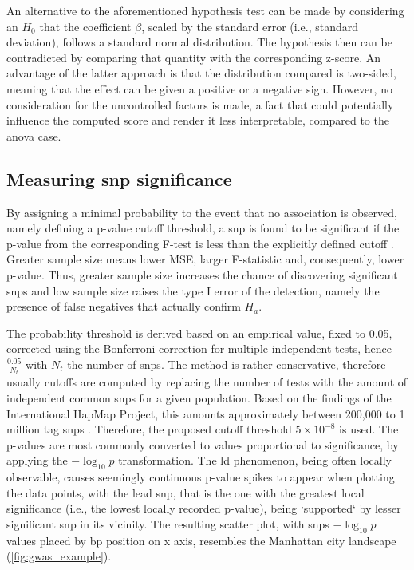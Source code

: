 An alternative to the aforementioned hypothesis test can be made by considering an $H_0$ that the coefficient $\beta$,  scaled by the standard error (i.e., standard deviation), follows a standard normal distribution. The hypothesis then can be contradicted by comparing that quantity with the corresponding z-score. An advantage of the latter approach is that the distribution compared is two-sided, meaning that the effect can be given a positive or a negative sign. However, no consideration for the uncontrolled factors is made, a fact that could potentially influence the computed score and render it less interpretable, compared to the \ac{anova} case.

\subsection{Measuring \ac{snp} significance}

By assigning a minimal probability to the event that no association is observed, namely defining a p-value cutoff threshold, a \ac{snp} is found to be significant if the p-value from the corresponding F-test is less than the explicitly defined cutoff \cite{AlejandroGonzalez-Chica2015}. Greater sample size means lower MSE, larger F-statistic and, consequently, lower p-value. Thus, greater sample size increases the chance of discovering significant \acp{snp} and low sample size raises the type I error of the detection, namely the presence of false negatives that actually confirm $H_a$.

The probability threshold is derived based on an empirical value, fixed to 0.05, corrected using the Bonferroni correction for multiple independent tests, hence $\frac{0.05}{N_t}$ with $N_t$ the number of \acp{snp}. The method is rather conservative, therefore usually cutoffs are computed by replacing the number of tests with the amount of independent common \acp{snp} for a given population. Based on the findings of the International HapMap Project, this amounts approximately between 200,000 to 1 million tag \acp{snp} \cite{Belmont2003}. Therefore, the proposed cutoff threshold $5\times 10 ^ {-8}$ is used. The p-values are most commonly converted to values proportional to significance, by applying the $-\log_{10}{p}$ transformation.   The \ac{ld} phenomenon, being often locally observable, causes seemingly continuous p-value spikes to appear when plotting the data points, with the lead \ac{snp}, that is the one with the greatest local significance (i.e., the lowest locally recorded p-value), being `supported` by lesser significant \ac{snp} in its vicinity. The resulting scatter plot, with \acp{snp} $-\log_{10}{p}$ values placed by bp position on x axis, resembles the Manhattan city landscape (\autoref{fig:gwas_example}).

